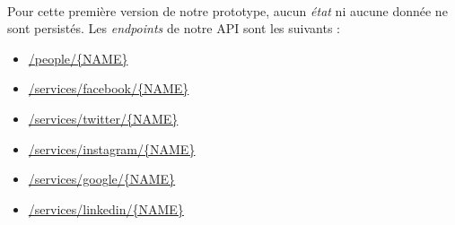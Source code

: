 \paragraph{} Pour cette première version de notre prototype, aucun \emph{état} ni aucune
donnée ne sont persistés. Les \emph{endpoints} de notre API sont les suivants :

\begin{itemize}
    \item \url{/people/{NAME}}
    \item \url{/services/facebook/{NAME}}
    \item \url{/services/twitter/{NAME}}
    \item \url{/services/instagram/{NAME}}
    \item \url{/services/google/{NAME}}
    \item \url{/services/linkedin/{NAME}}
\end{itemize}
